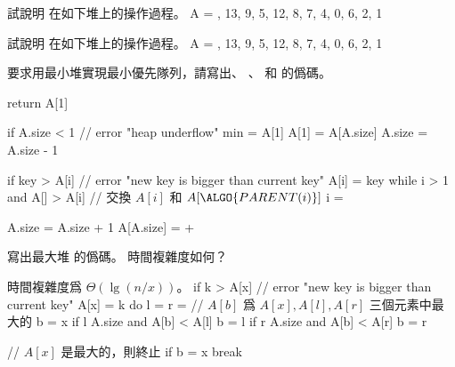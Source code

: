 \startsection[
  title={Priority queues},
]

\startEXERCISE
試說明  在如下堆上的操作過程。
\startformula
A = , 13, 9, 5, 12, 8, 7, 4, 0, 6, 2, 1 \rangle
\stopformula
\stopEXERCISE

\startANSWER
\startcombination[2*2]
{\externalfigure[output/e6_5_1-1]}{}
{\externalfigure[output/e6_5_1-2]}{}
{\externalfigure[output/e6_5_1-3]}{}
\stopcombination
\stopANSWER

\startEXERCISE
試說明  在如下堆上的操作過程。
\startformula
A = , 13, 9, 5, 12, 8, 7, 4, 0, 6, 2, 1 \rangle
\stopformula
\stopEXERCISE

\startANSWER
\startcombination[2*2]
{\externalfigure[output/e6_5_2-1]}{}
{\externalfigure[output/e6_5_2-2]}{}
{\externalfigure[output/e6_5_2-3]}{}
\stopcombination
\stopANSWER

\startEXERCISE
要求用最小堆實現最小優先隊列，請寫出、
、 和  的僞碼。
\stopEXERCISE

\startANSWER
{}
\startCLRSCODE
return A[1]
\stopCLRSCODE

\startCLRSCODE
if A.size < 1
	// error "heap underflow"
min = A[1]
A[1] = A[A.size]
A.size = A.size - 1
\stopCLRSCODE

\startCLRSCODE
if key > A[i]
	// error "new key is bigger than current key"
A[i] = key
while i > 1 and A[] > A[i]
	// 交換 $A[i]$ 和 $A[\ALGO{PARENT(i)}]$
	i = 
\stopCLRSCODE

\startCLRSCODE
A.size = A.size + 1
A[A.size] = +\infty
{}
\stopCLRSCODE
\stopANSWER

\startEXERCISE
寫出最大堆  的僞碼。
時間複雜度如何？
\stopEXERCISE

\startANSWER
時間複雜度爲 $\Theta(\lg (n/x))$。
\startCLRSCODE
if k > A[x]
	// error "new key is bigger than current key"
A[x] = k
do
	l = 
	r = 
	// $A[b]$ 爲 $A[x],A[l],A[r]$ 三個元素中最大的
	b = x
	if l \le A.size and A[b] < A[l]
		b = l
	if r \le A.size and A[b] < A[r]
		b = r

	// $A[x]$ 是最大的，則終止
	if b = x
		break

